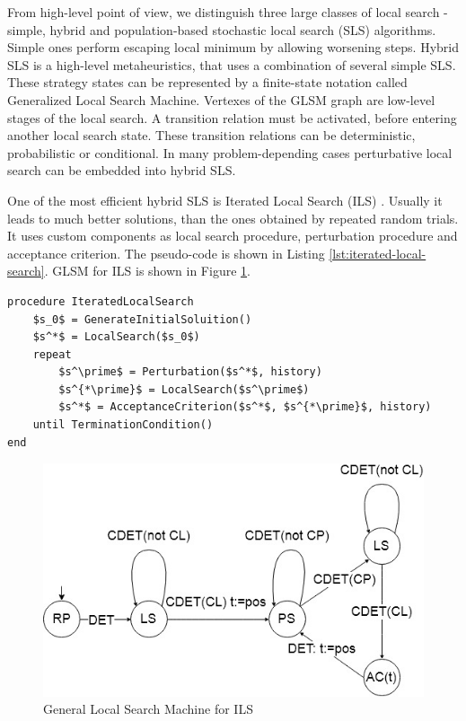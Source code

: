 \documentclass[12pt,a4paper,oneside]{book}
\begin{document}
From high-level point of view, we distinguish three large classes of local search - simple, hybrid and population-based stochastic local search (SLS) algorithms. Simple ones perform escaping local minimum by allowing worsening steps. Hybrid SLS is a high-level metaheuristics, that uses a combination of several simple SLS. These strategy states can be represented by a finite-state notation called Generalized Local Search Machine. Vertexes of the GLSM graph are low-level stages of the local search. A transition relation must be activated, before entering another local search state. These transition relations can be deterministic, probabilistic or conditional. In many problem-depending cases perturbative local search can be embedded into hybrid SLS.

One of the most efficient hybrid SLS is Iterated Local Search (ILS) \cite{STUTZLE2001ILS}. Usually it leads to much better solutions, than the ones obtained by repeated random trials. It uses custom components as local search procedure, perturbation procedure and acceptance criterion. The pseudo-code is shown in Listing \ref{lst:iterated-local-search}. GLSM for ILS is shown in Figure \ref{fig:ils}.


\begin{minipage}[c, breaklines=true]{0.95\textwidth}
\begin{lstlisting}[caption={Iterated Local Search pseudo-code}, label={lst:iterated-local-search}, mathescape=true]
procedure IteratedLocalSearch
	$s_0$ = GenerateInitialSoluition()
	$s^*$ = LocalSearch($s_0$)
	repeat
		$s^\prime$ = Perturbation($s^*$, history)
		$s^{*\prime}$ = LocalSearch($s^\prime$)
		$s^*$ = AcceptanceCriterion($s^*$, $s^{*\prime}$, history)
	until TerminationCondition()
end
\end{lstlisting}
\end{minipage}

\begin{figure}
  \centering
    \includegraphics[scale=0.7]{glsm-ils.jpg}
  \caption{General Local Search Machine for ILS}
  \label{fig:ils}
\end{figure}
\end{document}
